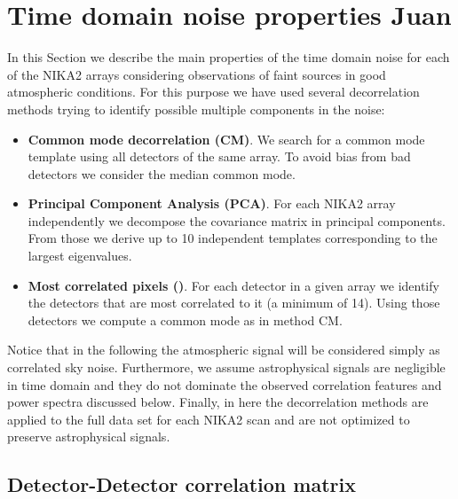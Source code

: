 %
%
%
%


%
%    
%
\section{Time domain noise properties {\color{YellowGreen} Juan}}
\label{se:noise}
In this Section we describe the main properties of the time domain noise for
each of the NIKA2 arrays considering observations of faint sources in good
atmospheric conditions. For this purpose we have used several decorrelation
methods trying to identify possible multiple components in the noise:

\begin{itemize}
\item {\bf Common mode decorrelation (CM)}. We search for a common mode template
  using all detectors of the same array. To avoid bias from bad detectors we
  consider the median common mode.

\item {\bf Principal Component Analysis (PCA)}. For each NIKA2 array
  independently we decompose the covariance matrix in principal components. From
  those we derive up to 10 independent templates corresponding to the largest
  eigenvalues.

\item {\bf Most correlated pixels (\cmoneb)}. For each detector in a given array we
  identify the detectors that are most correlated to it (a minimum of
  14). Using those detectors we compute a common mode as in method CM.
\end{itemize}

Notice that in the following the atmospheric signal will be considered simply as
correlated sky noise. Furthermore, we assume astrophysical signals are
negligible in time domain and they do not dominate the observed correlation
features and power spectra discussed below. Finally, in here the decorrelation
methods are applied to the full data set for each NIKA2 scan and are not
optimized to preserve astrophysical signals.
 
\subsection{Detector-Detector correlation matrix}

